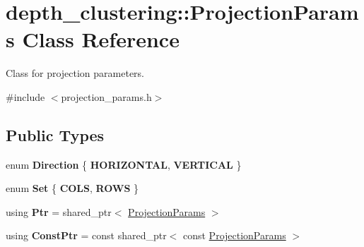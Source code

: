 \hypertarget{classdepth__clustering_1_1ProjectionParams}{\section{depth\-\_\-clustering\-:\-:Projection\-Params Class Reference}
\label{classdepth__clustering_1_1ProjectionParams}
}


Class for projection parameters.  




{\ttfamily \#include $<$projection\-\_\-params.\-h$>$}

\subsection*{Public Types}
\begin{DoxyCompactItemize}
\item 
enum {\bfseries Direction} \{ {\bfseries H\-O\-R\-I\-Z\-O\-N\-T\-A\-L}, 
{\bfseries V\-E\-R\-T\-I\-C\-A\-L}
 \}
\item 
enum {\bfseries Set} \{ {\bfseries C\-O\-L\-S}, 
{\bfseries R\-O\-W\-S}
 \}
\item 
\hypertarget{classdepth__clustering_1_1ProjectionParams_a87a8f4be62d13697c9598a611f7a1d25}{using {\bfseries Ptr} = shared\-\_\-ptr$<$ \hyperlink{classdepth__clustering_1_1ProjectionParams}{Projection\-Params} $>$}\label{classdepth__clustering_1_1ProjectionParams_a87a8f4be62d13697c9598a611f7a1d25}

\item 
\hypertarget{classdepth__clustering_1_1ProjectionParams_ad5f07311b2e51fde2850a27e8f518fdd}{using {\bfseries Const\-Ptr} = const shared\-\_\-ptr$<$ const \hyperlink{classdepth__clustering_1_1ProjectionParams}{Projection\-Params} $>$}\label{classdepth__clustering_1_1ProjectionParams_ad5f07311b2e51fde2850a27e8f518fdd}

\end{DoxyCompactItemize}
